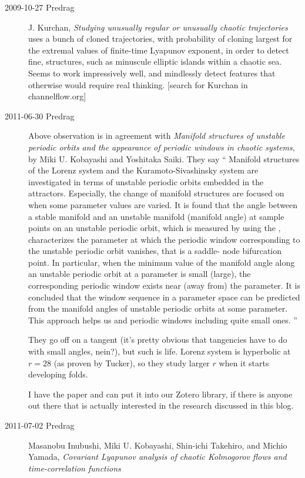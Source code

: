 \begin{description}
\item[2009-10-27 Predrag]
J. Kurchan, {\em Studying unusually regular or unusually chaotic
trajectories } uses a bunch of cloned trajectories, with probability of
cloning largest for the extremal values of finite-time Lyapunov exponent,
in order to detect fine, structures, such as minuscule elliptic islands
within a chaotic sea. Seems to work impressively well, and mindlessly
detect features that otherwise would require real thinking.
      	[search for Kurchan in channelflow.org]

\item[2011-06-30 Predrag] Above observation is in agreement with
\emph{Manifold structures of unstable periodic orbits and the appearance of periodic
windows in chaotic systems},
by Miki U. Kobayashi and Yoshitaka Saiki.
They say
``
Manifold structures of the Lorenz system and the Kuramoto-Sivashinsky
system are investigated in terms of unstable periodic orbits embedded in
the attractors. Especially, the change of manifold structures are focused
on when some parameter values are varied. It is found that the angle
between a stable manifold and an unstable manifold (manifold angle) at
sample points on an unstable periodic orbit, which is measured by using
the {\cLvs}, characterizes the parameter at which the
periodic window corresponding to the unstable periodic orbit vanishes,
that is a saddle- node bifurcation point. In particular, when the minimum
value of the manifold angle along an unstable periodic orbit at a
parameter is small (large), the corresponding periodic window exists near
(away from) the parameter. It is concluded that the window sequence in a
parameter space can be predicted from the manifold angles of unstable
periodic orbits at some parameter. This approach helps us and periodic
windows including quite small ones.
''

They go off on a tangent (it's pretty obvious that tangencies have to do
with small angles, nein?), but such is life.
Lorenz system is hyperbolic at $r = 28$ (as proven by Tucker),
so they study larger $r$ when it starts developing folds.

I have the paper and can put it into our Zotero library, if there is
anyone out there that is actually interested in the research discussed in
this blog.

\item[2011-07-02 Predrag]
Masanobu Inubushi, Miki U. Kobayashi, Shin-ichi Takehiro,
and Michio Yamada,
\emph{Covariant {Lyapunov} analysis of chaotic {Kolmogorov} flows
and time-correlation functions}


\end{description}
